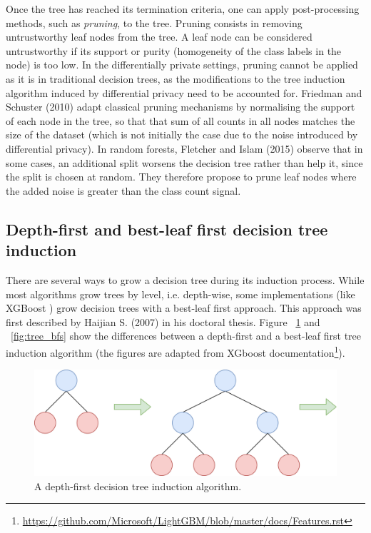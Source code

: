 Once the tree has reached its termination criteria, one can apply post-processing methods, such as \textit{pruning}, to the tree. Pruning consists in removing untrustworthy leaf nodes from the tree. A leaf node can be considered untrustworthy if its support or purity (homogeneity of the class labels in the node) is too low. In the differentially private settings, pruning cannot be applied as it is in traditional decision trees, as the modifications to the tree induction algorithm induced by differential privacy need to be accounted for. Friedman and Schuster (2010) \cite{friedman_schuster} adapt classical pruning mechanisms by normalising the support of each node in the tree, so that that sum of all counts in all nodes matches the size of the dataset (which is not initially the case due to the noise introduced by differential privacy). In random forests, Fletcher and Islam (2015) \cite{fletcher_signal} observe that in some cases, an additional split worsens the decision tree rather than help it, since the split is chosen at random. They therefore propose to prune leaf nodes where the added noise is greater than the class count signal.

\subsection{Depth-first and best-leaf first decision tree induction}\label{sec:growth}

There are several ways to grow a decision tree during its induction process. While most algorithms grow trees by level, i.e. depth-wise, some implementations (like XGBoost \cite{xgboost}) grow decision trees with a best-leaf first approach. This approach was first described by Haijian S. (2007) \cite{shi} in his doctoral thesis. Figure ~\ref{fig:tree_dfs} and ~\ref{fig:tree_bfs} show the differences between a depth-first and a best-leaf first tree induction algorithm (the figures are adapted from XGboost documentation\footnote{\href{https://github.com/Microsoft/LightGBM/blob/master/docs/Features.rst}{https://github.com/Microsoft/LightGBM/blob/master/docs/Features.rst}}).

\begin{figure}[h!]
	\center
	\includegraphics[scale=0.7]{images/dpgbdt/dfs}
	\caption{\label{fig:tree_dfs} A depth-first decision tree induction algorithm.}
\end{figure}

